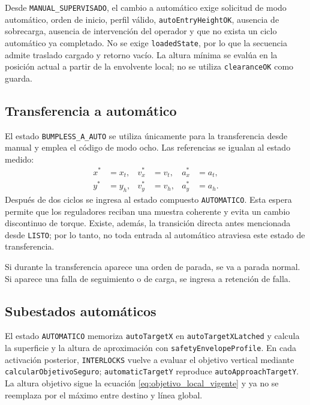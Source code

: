 \documentclass[a4paper,10pt,onecolumn,journal]{ieeeconf}
\numberwithin{equation}{section}
\begin{document}
Desde \texttt{MANUAL\_SUPERVISADO}, el cambio a automático exige solicitud de modo automático, orden de inicio, perfil válido, \texttt{autoEntryHeightOK}, ausencia de sobrecarga, ausencia de intervención del operador y que no exista un ciclo automático ya completado. No se exige \texttt{loadedState}, por lo que la secuencia admite traslado cargado y retorno vacío. La altura mínima se evalúa en la posición actual a partir de la envolvente local; no se utiliza \texttt{clearanceOK} como guarda.


\subsection{Transferencia a automático}
El estado \texttt{BUMPLESS\_A\_AUTO} se utiliza únicamente para la transferencia desde manual y emplea el código de modo ocho. Las referencias se igualan al estado medido:
\begin{align}
x^*&=x_t,&v_x^*&=v_t,&a_x^*&=a_t,\\
y^*&=y_h,&v_y^*&=v_h,&a_y^*&=a_h.
\end{align}
Después de dos ciclos se ingresa al estado compuesto \texttt{AUTOMATICO}. Esta espera permite que los reguladores reciban una muestra coherente y evita un cambio discontinuo de torque. Existe, además, la transición directa antes mencionada desde \texttt{LISTO}; por lo tanto, no toda entrada al automático atraviesa este estado de transferencia.

Si durante la transferencia aparece una orden de parada, se va a parada normal. Si aparece una falla de seguimiento o de carga, se ingresa a retención de falla.


\subsection{Subestados automáticos}
El estado \texttt{AUTOMATICO} memoriza \texttt{autoTargetX} en \texttt{autoTargetXLatched} y calcula la superficie y la altura de aproximación con \texttt{safetyEnvelopeProfile}. En cada activación posterior, \texttt{INTERLOCKS} vuelve a evaluar el objetivo vertical mediante \texttt{calcularObjetivoSeguro}; \texttt{automaticTargetY} reproduce \texttt{autoApproachTargetY}. La altura objetivo sigue la ecuación \eqref{eq:objetivo_local_vigente} y ya no se reemplaza por el máximo entre destino y línea global.
\end{document}
